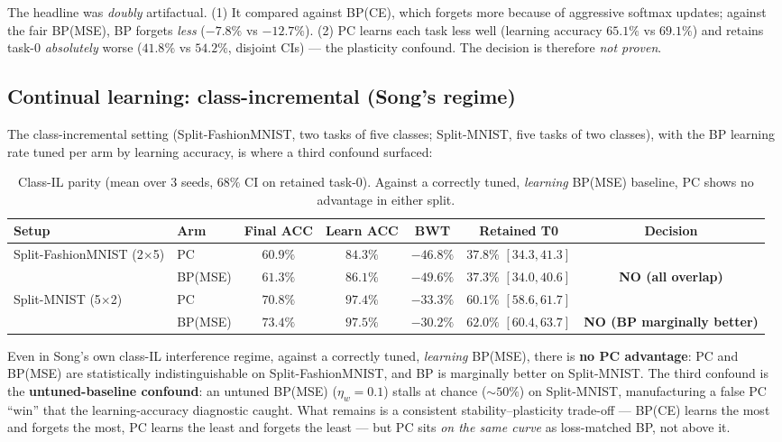 The headline was \emph{doubly} artifactual. (1) It compared against BP(CE), which forgets more
because of aggressive softmax updates; against the fair BP(MSE), BP forgets \emph{less}
(\(-7.8\%\) vs \(-12.7\%\)). (2) PC learns each task less well (learning accuracy \(65.1\%\) vs
\(69.1\%\)) and retains task-0 \emph{absolutely} worse (\(41.8\%\) vs \(54.2\%\), disjoint CIs) ---
the plasticity confound. The decision is therefore \emph{not proven}.

\subsection{Continual learning: class-incremental (Song's regime)}

The class-incremental setting (Split-FashionMNIST, two tasks of five classes; Split-MNIST, five
tasks of two classes), with the BP learning rate tuned per arm by learning accuracy, is where a
third confound surfaced:

\begin{table}[t]
  \centering
  \caption{Class-IL parity (mean over 3 seeds, \(68\%\) CI on retained task-0). Against a correctly
  tuned, \emph{learning} BP(MSE) baseline, PC shows no advantage in either split.}
  \label{tab:classil}
  \begin{tabular}{llccccc}
    \toprule
    Setup & Arm & Final ACC & Learn ACC & BWT & Retained T0 & Decision \\
    \midrule
    \multirow{2}{*}{Split-FashionMNIST (2\(\times\)5)}
      & PC      & \(60.9\%\) & \(84.3\%\) & \(-46.8\%\) & \(37.8\%\) \([34.3,41.3]\) & \\
      & BP(MSE) & \(61.3\%\) & \(86.1\%\) & \(-49.6\%\) & \(37.3\%\) \([34.0,40.6]\) & \textbf{NO (all overlap)} \\
    \midrule
    \multirow{2}{*}{Split-MNIST (5\(\times\)2)}
      & PC      & \(70.8\%\) & \(97.4\%\) & \(-33.3\%\) & \(60.1\%\) \([58.6,61.7]\) & \\
      & BP(MSE) & \(73.4\%\) & \(97.5\%\) & \(-30.2\%\) & \(62.0\%\) \([60.4,63.7]\) & \textbf{NO (BP marginally better)} \\
    \bottomrule
  \end{tabular}
\end{table}

Even in Song's own class-IL interference regime, against a correctly tuned, \emph{learning} BP(MSE),
there is \textbf{no PC advantage}: PC and BP(MSE) are statistically indistinguishable on
Split-FashionMNIST, and BP is marginally better on Split-MNIST. The third confound is the
\textbf{untuned-baseline confound}: an untuned BP(MSE) (\(\eta_w=0.1\)) stalls at chance
(\(\sim\!50\%\)) on Split-MNIST, manufacturing a false PC ``win'' that the learning-accuracy
diagnostic caught. What remains is a consistent stability--plasticity trade-off --- BP(CE) learns
the most and forgets the most, PC learns the least and forgets the least --- but PC sits
\emph{on the same curve} as loss-matched BP, not above it.

